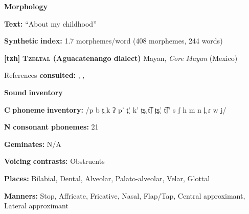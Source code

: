 \begin{styleBody}
\textbf{Morphology}
\end{styleBody}

\begin{styleBody}
\textbf{Text:} “About my childhood” \citep[248-250]{Yumitani1998}
\end{styleBody}

\begin{styleBody}
\textbf{Synthetic} \textbf{index:} 1.7 morphemes/word (408 morphemes, 244 words)
\end{styleBody}

\begin{styleBody}
\textbf{[tzh]}   \textbf{\textsc{Tzeltal} \textbf{(Aguacatenango} \textbf{dialect)}}  Mayan, \textit{Core} \textit{Mayan} (Mexico)
\end{styleBody}

\begin{styleBody}
References \textbf{consulted:} \citet{Kaufman1971}, \citet{Polian2006}, \citet{Smith2007}
\end{styleBody}

\begin{styleBody}
\textbf{Sound} \textbf{inventory}
\end{styleBody}

\begin{styleBody}
\textbf{C} \textbf{phoneme} \textbf{inventory:} /p b t̪ k ʔ p’ t̪’ k’ t̪s̪ t͡ʃ t̪s̪’ t͡ʃ’ s ʃ h m n l̪ ɾ w j/
\end{styleBody}

\begin{styleBody}
\textbf{N} \textbf{consonant} \textbf{phonemes:} 21
\end{styleBody}

\begin{styleBody}
\textbf{Geminates:} N/A
\end{styleBody}

\begin{styleBody}
\textbf{Voicing} \textbf{contrasts:} Obstruents
\end{styleBody}

\begin{styleBody}
\textbf{Places:} Bilabial, Dental, Alveolar, Palato-alveolar, Velar, Glottal
\end{styleBody}

\begin{styleBody}
\textbf{Manners:} Stop, Affricate, Fricative, Nasal, Flap/Tap, Central approximant, Lateral approximant
\end{styleBody}

